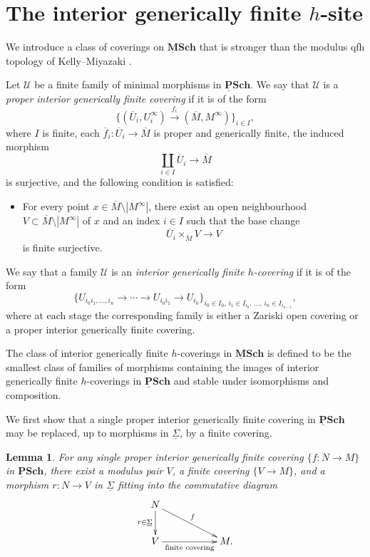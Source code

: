 \documentclass[11pt]{amsart}
\newcommand{\ul}[1]{{\underline{#1}}}
\newcommand{\ol}{\overline}
\newcommand{\ulPSCH}{\operatorname{\mathbf{\underline{P}Sch}}}
\newcommand{\ulMSCH}{\operatorname{\mathbf{\underline{M}Sch}}}
\def\Minf{M^{\infty}}
\newtheorem{lemma}{Lemma}[section]
\theoremstyle{definition}
\theoremstyle{remark}
\numberwithin{equation}{section}
\begin{document}
\section{The interior generically finite \texorpdfstring{$h$}{h}-site}\label{section2}

We introduce a class of coverings on $\ulMSCH$ that is stronger than the modulus qfh topology of Kelly--Miyazaki \cite[Definition 4.7]{KM21}.

Let $\mathcal{U}$ be a finite family of minimal morphisms in $\ulPSCH$. We say that $\mathcal{U}$ is a \textit{proper interior generically finite covering} if it is of the form
\[
\{(\ol{U}_{i},U_{i}^\infty) \overset{f_i}{\to} (\ol{M},\Minf)\}_{i \in I},
\]
where $I$ is finite, each $\ol{f}_i:\ol{U}_i \to \ol{M}$ is proper and generically finite, the induced morphism
\[
\coprod_{i\in I}\ol{U}_i \longrightarrow \ol{M}
\]
is surjective, and the following condition is satisfied:
\begin{itemize}
    \item[($\star$)] For every point $x\in \ol{M}\setminus |\Minf|$, there exist an open neighbourhood $V \subset \ol{M}\setminus |\Minf|$ of $x$ and an index $i\in I$ such that the base change
    \[
    \ol{U}_{i}\times_{\ol{M}} V \to V
    \]
    is finite surjective.
\end{itemize}

We say that a family $\mathcal{U}$ is an \textit{interior generically finite $h$-covering} if it is of the form
\[
\{U_{i_0i_1,\dots,i_n} \to \cdots \to U_{i_0i_1} \to U_{i_0}\}_{i_0 \in I_0,\, i_1\in I_{i_0},\,\dots,\,i_n\in I_{i_{n-1}}},
\]
where at each stage the corresponding family is either a Zariski open covering or a proper interior generically finite covering.

The class of interior generically finite $h$-coverings in $\ulMSCH$ is defined to be the smallest class of families of morphisms containing the images of interior generically finite $h$-coverings in $\ulPSCH$ and stable under isomorphisms and composition.

We first show that a single proper interior generically finite covering in $\ulPSCH$ may be replaced, up to morphisms in $\ul{\Sigma}$, by a finite covering.

\begin{lemma}\label{singlelemma}
For any single proper interior generically finite covering $\{f:N \to M\}$ in $\ulPSCH$, there exist a modulus pair $V$, a finite covering $\{V\to M\}$, and a morphism $r:N \to V$ in $\ul{\Sigma}$ fitting into the commutative diagram
\[
\xymatrix{
N \ar[d]_-{r \in \ul{\Sigma}} \ar[drr]^-{f}& & \\
V \ar[rr]_-{\text{finite covering}}&  & M.
}
\]
\end{lemma}
\end{document}
